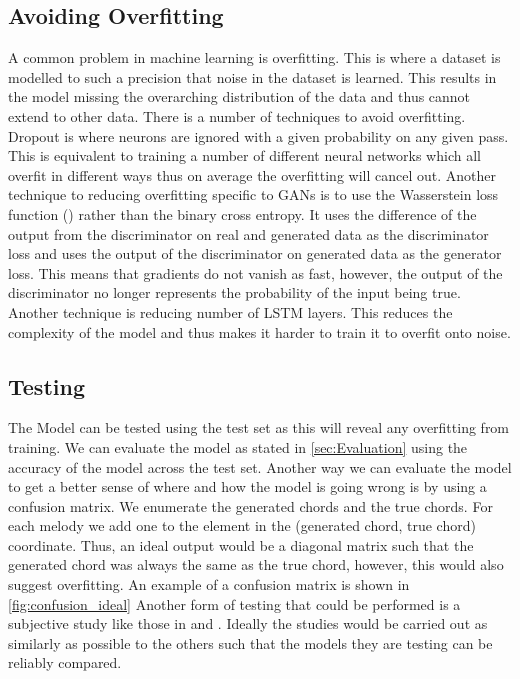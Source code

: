 \subsection{Avoiding Overfitting}
A common problem in machine learning is overfitting. This is where a dataset is modelled to such a precision that noise in the dataset is learned.
This results in the model missing the overarching distribution of the data and thus cannot extend to other data.
There is a number of techniques to avoid overfitting.
Dropout is where neurons are ignored with a given probability on any given pass. 
This is equivalent to training a number of different neural networks which all overfit in different ways thus on average the overfitting will cancel out.
Another technique to reducing overfitting specific to GANs is to use the Wasserstein loss function (\cite{Wasserstein}) rather than the binary cross entropy. 
It uses the difference of the output from the discriminator on real and generated data as the discriminator loss and uses the output of the discriminator on generated data as the generator loss.
This means that gradients do not vanish as fast, however, the output of the discriminator no longer represents the probability of the input being true.
Another technique is reducing number of LSTM layers. 
This reduces the complexity of the model and thus makes it harder to train it to overfit onto noise.


\subsection{Testing}
The Model can be tested using the test set as this will reveal any overfitting from training. 
We can evaluate the model as stated in \cref{sec:Evaluation} using the accuracy of the model across the test set.
Another way we can evaluate the model to get a better sense of where and how the model is going wrong is by using a confusion matrix.
We enumerate the generated chords and the true chords. 
For each melody we add one to the element in the (generated chord, true chord) coordinate. 
Thus, an ideal output would be a diagonal matrix such that the generated chord was always the same as the true chord, however, this would also suggest overfitting.
An example of a confusion matrix is shown in \cref{fig:confusion_ideal}
Another form of testing that could be performed is a subjective study like those in \cite{MySong} and \cite{BLSTM}.
Ideally the studies would be carried out as similarly as possible to the others such that the models they are testing can be reliably compared.

